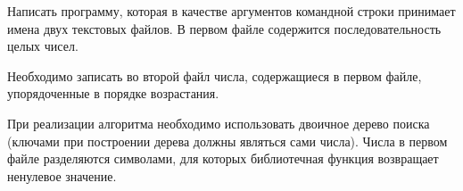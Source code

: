 

Написать программу, которая в качестве аргументов командной строки
принимает имена двух текстовых файлов. В первом файле содержится
последовательность целых чисел.

Необходимо записать во второй файл
числа, содержащиеся в первом файле, упорядоченные в порядке
возрастания.

При реализации алгоритма необходимо использовать
двоичное дерево поиска (ключами при построении дерева должны
являться сами числа). Числа в первом файле разделяются символами, для
которых библиотечная функция  возвращает ненулевое значение.
